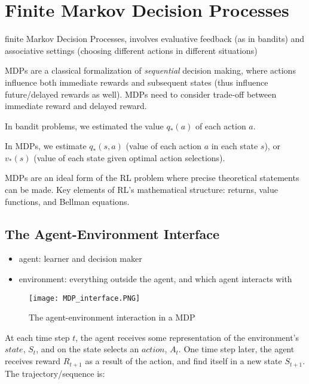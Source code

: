 \documentclass[sutton_barto_notes.tex]{subfiles}
\begin{document}
\newpage
\section{Finite Markov Decision Processes}


\begin{definition}
finite Markov Decision Processes, involves evaluative feedback (as in bandits) and associative settings (choosing different actions in different situations)
\end{definition}

MDPs are a classical formalization of \textit{sequential} decision making, where actions influence both immediate rewards and subsequent states (thus influence future/delayed rewards as well). MDPs need to consider trade-off between immediate reward and delayed reward.

In bandit problems, we estimated the value $q_{*}(a)$ of each action $a$.

In MDPs, we estimate $q_{*}(s,a)$ (value of each action $a$ in each state $s$), or $v_{*}(s)$ (value of each state given optimal action selections).

MDPs are an ideal form of the RL problem where precise theoretical statements can be made.
Key elements of RL's mathematical structure: returns, value functions, and Bellman equations.

\subsection{The Agent-Environment Interface}

\begin{itemize}
\item agent: learner and decision maker
\item environment: everything outside the agent, and which agent interacts with
\end{itemize}

\begin{figure}[!h]
  \texttt{[image: MDP\_interface.PNG]}
  \caption{The agent-environment interaction in a MDP}
  \label{fig:MDP_interface}
\end{figure}

At each time step $t$, the agent receives some representation of the environment's $state$, $S_t$, and on the state selects an $action$, $A_t$. One time step later, the agent receives reward $R_{t+1}$ as a result of the action, and find itself in a new state $S_{t+1}$. The trajectory/sequence is:
\end{document}
